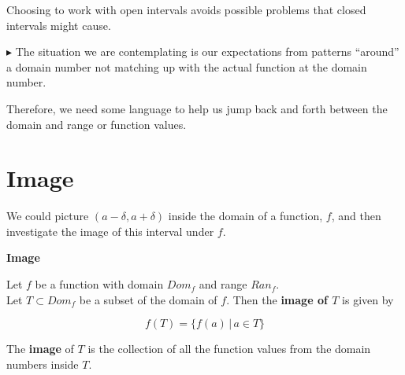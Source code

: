 \documentclass{ximera}
\begin{document}
Choosing to work with open intervals avoids possible problems that closed intervals might cause.






\textbf{\textcolor{red!70!darkgray}{$\blacktriangleright$}} The situation we are contemplating is our expectations from patterns ``around'' a domain number not matching up with the actual function at the domain number.

Therefore, we need some language to help us jump back and forth between the domain and range or function values.





















\section*{Image}


We could picture $(a-\delta, a+\delta)$ inside the domain of a function, $f$, and then investigate the image of this interval under $f$.  







\begin{idea} \textbf{\textcolor{blue!55!black}{Image}}

Let $f$ be a function with domain $Dom_f$ and range $Ran_f$. \\
Let $T \subset Dom_f$ be a subset of the domain of $f$.  Then the \textbf{image of $T$} is given by

\[       f(T) = \{   f(a)  \, | \, a \in T            \}             \]


The \textbf{image} of $T$ is the collection of all the function values from the domain numbers inside $T$.


\end{idea}
\end{document}
